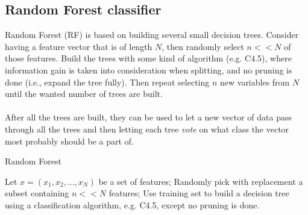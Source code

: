 \subsection{Random Forest classifier}
Random Forest (RF) is based on building several small decision trees. Consider having a feature vector that is of length $N$, then randomly select $n << N$ of those features. Build the trees with some kind of algorithm (e.g. C4.5), where information gain is taken into consideration when splitting, and no pruning is done (i.e., expand the tree fully). Then repeat selecting $n$ new variables from $N$ until the wanted number of trees are built.
\\\\
After all the trees are built, they can be used to let a new vector of data pass through all the trees and then letting each tree \emph{vote} on what class the vector most probably should be a part of.

\begin{algorithm}
\caption{Random Forest
    \label{alg:RF}}
\begin{algorithmic}
\State Let $x = (x_1,x_2,...,x_N)$ be a set of features;
	\State Randomly pick with replacement a subset containing $n << N$ features;
	\State Use training set to build a decision tree using a classification algorithm, e.g. C4.5, except no pruning is done.
\EndWhile
\end{algorithmic}
\end{algorithm}